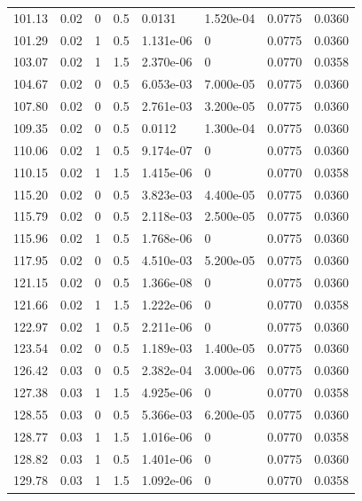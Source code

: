 \documentclass[preview]{standalone}
\begin{document}
{{{\begin{tabular}{L{1.2cm}C{1.2cm} C{0.3cm}C{0.5cm} C{1.4cm}C{1.4cm} C{1.4cm}C{1.4cm}}
  101.13  &  0.02  & 0     & 0.5 &  0.0131  & 1.520e-04  & 0.0775 &  0.0360   \\ 
  101.29  &  0.02  & 1     & 0.5 &  1.131e-06  & 0  & 0.0775 &  0.0360   \\ 
  103.07  &  0.02  & 1     & 1.5 &  2.370e-06  & 0  & 0.0770 &  0.0358   \\ 
  104.67  &  0.02  & 0     & 0.5 &  6.053e-03  & 7.000e-05  & 0.0775 &  0.0360   \\ 
  107.80  &  0.02  & 0     & 0.5 &  2.761e-03  & 3.200e-05  & 0.0775 &  0.0360   \\ 
  109.35  &  0.02  & 0     & 0.5 &  0.0112  & 1.300e-04  & 0.0775 &  0.0360   \\ 
  110.06  &  0.02  & 1     & 0.5 &  9.174e-07  & 0  & 0.0775 &  0.0360   \\ 
  110.15  &  0.02  & 1     & 1.5 &  1.415e-06  & 0  & 0.0770 &  0.0358   \\ 
  115.20  &  0.02  & 0     & 0.5 &  3.823e-03  & 4.400e-05  & 0.0775 &  0.0360   \\ 
  115.79  &  0.02  & 0     & 0.5 &  2.118e-03  & 2.500e-05  & 0.0775 &  0.0360   \\ 
  115.96  &  0.02  & 1     & 0.5 &  1.768e-06  & 0  & 0.0775 &  0.0360   \\ 
  117.95  &  0.02  & 0     & 0.5 &  4.510e-03  & 5.200e-05  & 0.0775 &  0.0360   \\ 
  121.15  &  0.02  & 0     & 0.5 &  1.366e-08  & 0  & 0.0775 &  0.0360   \\ 
  121.66  &  0.02  & 1     & 1.5 &  1.222e-06  & 0  & 0.0770 &  0.0358   \\ 
  122.97  &  0.02  & 1     & 0.5 &  2.211e-06  & 0  & 0.0775 &  0.0360   \\ 
  123.54  &  0.02  & 0     & 0.5 &  1.189e-03  & 1.400e-05  & 0.0775 &  0.0360   \\ 
  126.42  &  0.03  & 0     & 0.5 &  2.382e-04  & 3.000e-06  & 0.0775 &  0.0360   \\ 
  127.38  &  0.03  & 1     & 1.5 &  4.925e-06  & 0  & 0.0770 &  0.0358   \\ 
  128.55  &  0.03  & 0     & 0.5 &  5.366e-03  & 6.200e-05  & 0.0775 &  0.0360   \\ 
  128.77  &  0.03  & 1     & 1.5 &  1.016e-06  & 0  & 0.0770 &  0.0358   \\ 
  128.82  &  0.03  & 1     & 0.5 &  1.401e-06  & 0  & 0.0775 &  0.0360   \\ 
  129.78  &  0.03  & 1     & 1.5 &  1.092e-06  & 0  & 0.0770 &  0.0358   \\ 

\end{tabular}}}}
\end{document}
